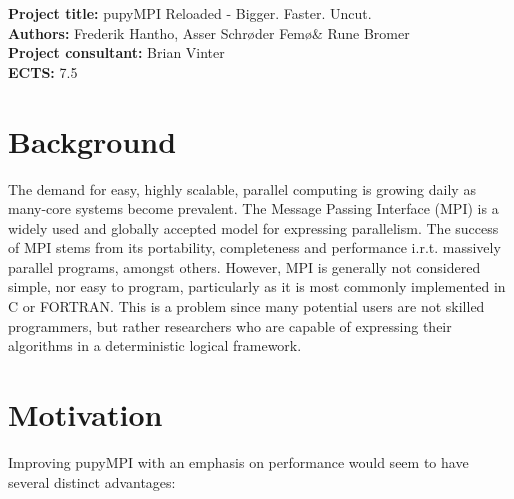 \documentclass{article}
\begin{document}
\pagestyle{fancy}

\setlength\headheight{2cm}

\noindent
\textbf{Project title:} pupyMPI Reloaded - Bigger. Faster. Uncut.\\

\noindent
\textbf{Authors:} Frederik Hantho, Asser Schrøder Femø\& Rune Bromer\\

\noindent
\textbf{Project consultant:} Brian Vinter\\

\noindent
\textbf{ECTS:} 7.5\\


\section*{Background}
The demand for easy, highly scalable, parallel computing is growing daily as
many-core systems become prevalent. The Message Passing Interface (MPI) is a
widely used and globally accepted model for expressing parallelism. The success
of MPI stems from its portability, completeness and performance i.r.t. massively
parallel programs, amongst others. However, MPI is generally not considered
simple, nor easy to program, particularly as it is most commonly implemented in
C or FORTRAN. This is a problem since many potential users are not skilled
programmers, but rather researchers who are capable of expressing their
algorithms in a deterministic logical framework.
\\


\section*{Motivation}

Improving pupyMPI with an emphasis on performance would seem to have several distinct advantages:
\end{document}
